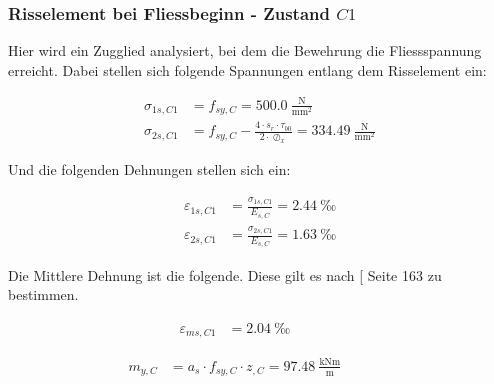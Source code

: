 \documentclass[
  11pt,
  letterpaper,
]{scrreprt}
\begin{document}
\subsubsection{\texorpdfstring{Risselement bei Fliessbeginn - Zustand
\(C1\)}{Risselement bei Fliessbeginn - Zustand C1}}\label{risselement-bei-fliessbeginn---zustand-c1}

Hier wird ein Zugglied analysiert, bei dem die Bewehrung die
Fliessspannung erreicht. Dabei stellen sich folgende Spannungen entlang
dem Risselement ein:

\[
\begin{aligned}
\sigma_{1 s , C1}& = f_{sy , C} = 500.0 \ \frac{\mathrm{N}}{\mathrm{mm}^{2}} \\ 
\sigma_{2 s , C1}& = f_{sy , C} - \frac{4 \cdot s_{r} \cdot \tau_{b0}}{2 \cdot \oslash_{x}} = 334.49 \ \frac{\mathrm{N}}{\mathrm{mm}^{2}} \end{aligned}
\]

Und die folgenden Dehnungen stellen sich ein:

\[
\begin{aligned}
\varepsilon_{1 s , C1}& = \frac{\sigma_{1 s , C1}}{E_{s , C}} = 2.44 \ \mathrm{‰} \\ 
\varepsilon_{2 s , C1}& = \frac{\sigma_{2 s , C1}}{E_{s , C}} = 1.63 \ \mathrm{‰} \end{aligned}
\]

Die Mittlere Dehnung ist die folgende. Diese gilt es nach
{[}\citeproc{ref-alvarez_einfluss_1998}{6}{]} Seite 163 zu bestimmen.

\[
\begin{aligned}
\varepsilon_{m s , C1}& = 2.04 \ \mathrm{‰} \quad &  \quad &  
 \end{aligned}
\]

\[
\begin{aligned}
m_{y , C}& = a_{s} \cdot f_{sy , C} \cdot z_{, C} = 97.48 \ \frac{\mathrm{kNm}}{\mathrm{m}} \quad &  \quad &  
 \end{aligned}
\]
\end{document}
